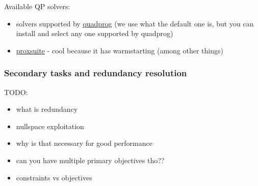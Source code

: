Available QP solvers:
\begin{itemize}
		\item solvers supported by \href{https://github.com/quadprog/quadprog}{quadprog} (we use what the default one is,
				but you can install and select any one supported
				by quadprog)
		\item \href{https://github.com/Simple-Robotics/proxsuite}{proxsuite} - cool because it has warmstarting
				(among other things)
\end{itemize}

\subsubsection{Secondary tasks and redundancy resolution}
TODO:
\begin{itemize}
		\item what is redundancy
		\item nullspace exploitation
		\item why is that necessary for good performance
		\item can you have multiple primary objectives tho??
		\item constraints vs objectives
\end{itemize}


